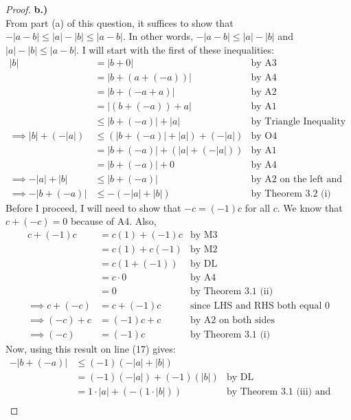 \documentclass[10pt,a4paper]{article}
\theoremstyle{definition}
\begin{document}
\begin{proof}{\textbf{b.)}}
\\From part (a) of this question, it suffices to show that $-|a-b| \leq |a| - |b| \leq |a - b|$. In other words, $-|a - b| \leq |a| - |b|$ and $|a| - |b| \leq |a-b|$. I will start with the first of these inequalities:
\begin{align}
|b| &= |b + 0| &\text{by A3}\nonumber\\
&= |b + (a + (-a))| &\text{by A4}\nonumber\\
&= |b + (-a + a)| &\text{by A2}\nonumber\\
&= |(b + (-a)) + a| &\text{by A1}\nonumber\\
&\leq |b + (-a)| + |a| &\text{by Triangle Inequality}\nonumber\\
\implies |b| + (-|a|) &\leq (|b + (-a)| + |a|) + (-|a|) &\text{by O4}\nonumber\\
&= |b + (-a)| + (|a| + (-|a|)) &\text{by A1}\nonumber\\
&= |b + (-a)| + 0 &\text{by A4}\nonumber\\
\implies -|a| + |b| &\leq |b + (-a)| &\text{by A2 on the left and A3 on the right}\nonumber\\
\implies -|b + (-a)| &\leq -(-|a| + |b|) &\text{by Theorem 3.2 (i)}
\end{align}
Before I proceed, I will need to show that $-c = (-1)c$ for all $c$. We know that $c + (-c) = 0$ because of A4. Also, 
\begin{align*}
c + (-1)c &= c(1) + (-1)c &\text{by M3}\\
&= c(1) + c(-1) &\text{by M2}\\
&= c(1 + (-1)) &\text{by DL}\\
&= c \cdot 0 &\text{by A4}\\
&= 0 &\text{by Theorem 3.1 (ii)}\\
\implies c + (-c) &= c + (-1)c &\text{since LHS and RHS both equal 0}\\
\implies (-c) + c &= (-1)c + c &\text{by A2 on both sides}\\
\implies (-c) &= (-1)c &\text{by Theorem 3.1 (i)}
\end{align*}
Now, using this result on line (17) gives:
\begin{align*}
-|b + (-a)| &\leq (-1)(-|a| + |b|)\\
&= (-1)(-|a|) + (-1)(|b|) &\text{by DL}\\
&= 1\cdot |a| + (-(1\cdot |b|)) &\text{by Theorem 3.1 (iii) and (iv)}\\

\end{align*}
\end{proof}
\end{document}
